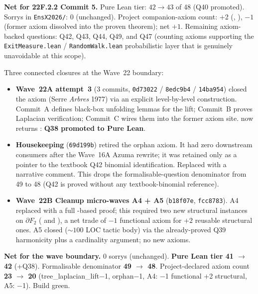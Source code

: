 \documentclass[11pt,a4paper]{article}
\newcommand{\cmd}[1]{\texttt{\small #1}}
\newcommand{\lmod}[1]{\texttt{\small #1}}
\theoremstyle{plain}
\theoremstyle{definition}
\begin{document}
\textbf{Net for 22F.2.2 Commit 5.} Pure Lean tier: $42\to 43$ of 48
(Q40 promoted). Sorrys in \lmod{EnsX2026/}: 0 (unchanged). Project
companion-axiom count: +2 (,
), $-1$ (former
 axiom dissolved into the
proven theorem); net $+1$. Remaining axiom-backed questions: Q42, Q43,
Q44, Q49, and Q47 (counting axioms supporting the
\lmod{ExitMeasure.lean} / \lmod{RandomWalk.lean} probabilistic layer
that is genuinely unavoidable at this scope).

Three connected closures at the Wave~22 boundary:

\begin{itemize}[nosep]
  \item \textbf{Wave~22A attempt~3} (3 commits, \cmd{0d73022} / \cmd{8edc9b4} / \cmd{14ba954}) closed the  axiom (Serre \emph{Arbres} 1977) via an explicit level-by-level construction. Commit~A defines black-box unfolding lemmas for the lift; Commit~B proves Laplacian verification; Commit~C wires them into the former axiom site.  now returns : \textbf{Q38 promoted to Pure Lean}.
  \item \textbf{Housekeeping} (\cmd{69d199b}) retired the orphan  axiom. It had zero downstream consumers after the Wave~16A Azuma rewrite; it was retained only as a pointer to the textbook Q42 binomial identification. Replaced with a narrative comment. This drops the formalisable-question denominator from 49 to 48 (Q42 is proved without any textbook-binomial reference).
  \item \textbf{Wave~22B Cleanup micro-waves A4 + A5} (\cmd{b18f07e}, \cmd{fcc8783}). A4 replaced  with a full -based proof; this required two new structural instances on $\partial F_2$ ( and ), a net trade of $-1$ functional axiom for $+2$ reusable structural ones. A5 closed  (${\sim}100$ LOC tactic body) via the already-proved Q39 harmonicity plus a cardinality argument; no new axioms.
\end{itemize}

\textbf{Net for the wave boundary.} 0 sorrys (unchanged).
\textbf{Pure Lean tier 41 $\to$ 42} (+Q38). Formalisable
denominator \textbf{49 $\to$ 48}. Project-declared axiom count
\textbf{23 $\to$ 20} (tree\_laplacian\_lift$-$1, orphan$-$1,
A4: $-$1 functional $+$2 structural, A5: $-$1).
Build green.
\end{document}
